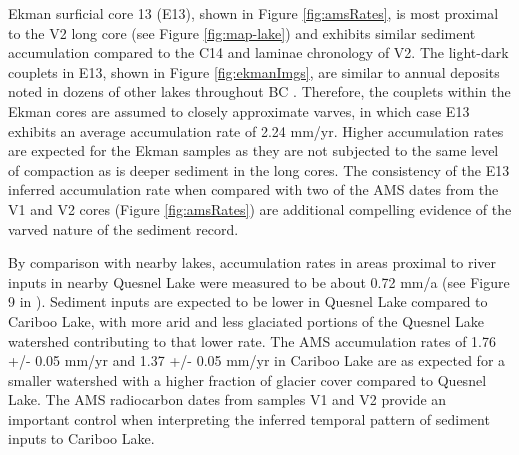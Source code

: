 \documentclass[Royal,times,doublespace,sageh]{sagej}
\begin{document}
Ekman surficial core 13 (E13), shown in Figure \ref{fig:amsRates}, is
most proximal to the V2 long core (see Figure \ref{fig:map-lake}) and
exhibits similar sediment accumulation compared to the C14 and laminae
chronology of V2. The light-dark couplets in E13, shown in Figure
\ref{fig:ekmanImgs}, are similar to annual deposits noted in dozens of
other lakes throughout BC \citep[e.g.][]{Hodder2006b}. Therefore, the
couplets within the Ekman cores are assumed to closely approximate
varves, in which case E13 exhibits an average accumulation rate of 2.24
mm/yr. Higher accumulation rates are expected for the Ekman samples as
they are not subjected to the same level of compaction as is deeper
sediment in the long cores. The consistency of the E13 inferred
accumulation rate when compared with two of the AMS dates from the V1
and V2 cores (Figure \ref{fig:amsRates}) are additional compelling
evidence of the varved nature of the sediment record.

By comparison with nearby lakes, accumulation rates in areas proximal to
river inputs in nearby Quesnel Lake were measured to be about 0.72 mm/a
(see Figure 9 in \citet{Gilbert2012}). Sediment inputs are expected to
be lower in Quesnel Lake compared to Cariboo Lake, with more arid and
less glaciated portions of the Quesnel Lake watershed contributing to
that lower rate. The AMS accumulation rates of 1.76 +/- 0.05 mm/yr and
1.37 +/- 0.05 mm/yr in Cariboo Lake are as expected for a smaller
watershed with a higher fraction of glacier cover compared to Quesnel
Lake. The AMS radiocarbon dates from samples V1 and V2 provide an
important control when interpreting the inferred temporal pattern of
sediment inputs to Cariboo Lake.
\end{document}
